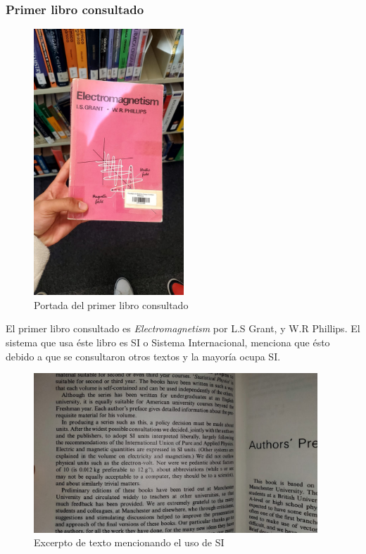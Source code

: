 \documentclass[12pt, letterpaper]{report}
\begin{document}
\subsubsection*{Primer libro consultado}
\begin{figure}[H]
    \centering
    \includegraphics[height = 10cm]{2024-04-01_LibroElectromagnetismo_1.jpeg}
    \caption{Portada del primer libro consultado}
\end{figure}
El primer libro consultado es \textit{Electromagnetism} por L.S Grant, y W.R Phillips. 
El sistema que usa éste libro es SI o Sistema Internacional, menciona que ésto debido a que se consultaron 
otros textos y la mayoría ocupa SI. 
\begin{figure}[H]
    \centering
    \includegraphics[height = 6cm]{2024-04-01_LibroElectromagnetismo_2.jpeg}
    \caption{Excerpto de texto mencionando el uso de SI}
\end{figure}
\end{document}
